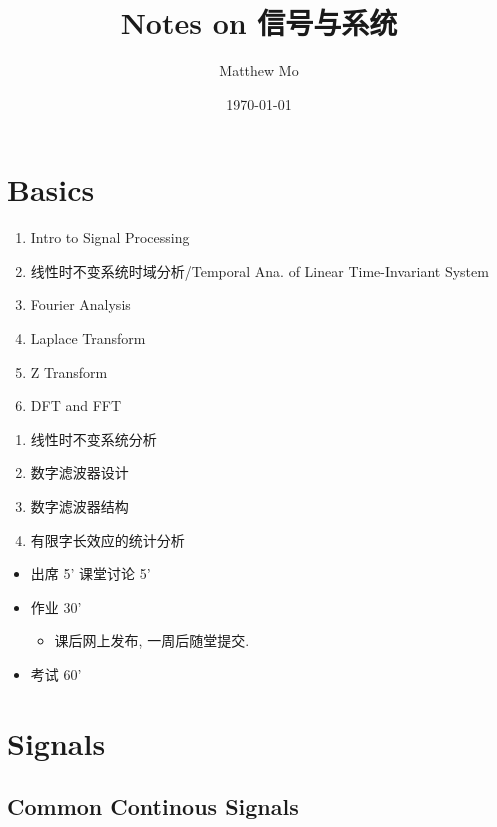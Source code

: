 \documentclass{article}
\title{\textbf{Notes on 信号与系统}}
\author{Matthew Mo}
\date{\today}
\begin{document}
\maketitle
\tableofcontents

\section{Basics}

    \begin{enumerate}
        \item Intro to Signal Processing
        \item 线性时不变系统时域分析/Temporal Ana. of Linear Time-Invariant System
        \item Fourier Analysis
        \item Laplace Transform
        \item Z Transform
        \item DFT and FFT
    \end{enumerate}
    
    \begin{enumerate}
        \item 线性时不变系统分析
        \item 数字滤波器设计
        \item 数字滤波器结构
        \item 有限字长效应的统计分析
    \end{enumerate}

    \begin{itemize}
        \item 出席 5' 课堂讨论 5' 
        \item 作业 30'
        \begin{itemize}
            \item 课后网上发布, 一周后随堂提交.
        \end{itemize}
        \item 考试 60'
    \end{itemize}

\section{Signals}

\subsection{Common Continous Signals}
\end{document}
